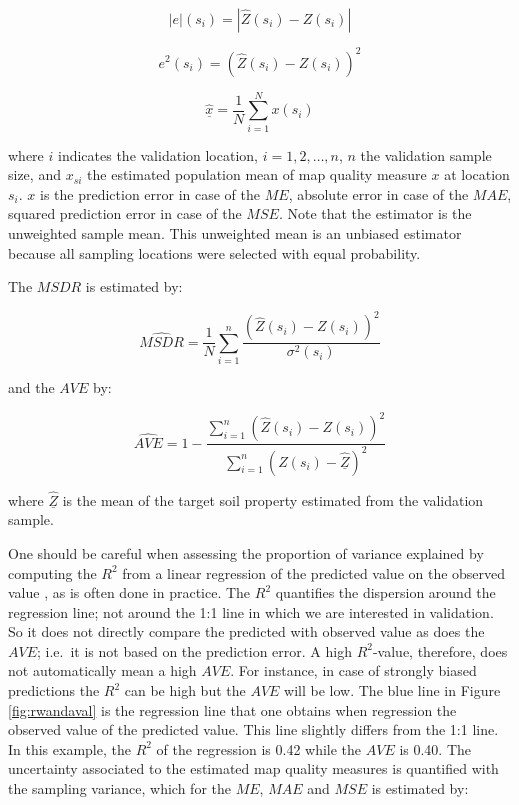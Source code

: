 \documentclass[10pt,b5paper,]{book}
\theoremstyle{definition}
\theoremstyle{definition}
\theoremstyle{definition}
\theoremstyle{remark}
\begin{document}
\begin{equation}
|e|(s_i) = |\hat{Z}(s_i) - Z(s_i)|
\end{equation}

\begin{equation}
e^2(s_i) =( \hat{Z}(s_i) - Z(s_i))^2
\end{equation}

\begin{equation}
\underline{\hat{x}} = \frac{1}{N} \sum_{i=1}^{N} x(s_i)
\end{equation}

where \(i\) indicates the validation location, \(i = 1, 2, \dots, n\),
\(n\) the validation sample size, and \(x_{si}\) the estimated
population mean of map quality measure \(x\) at location \(s_i\). \(x\)
is the prediction error in case of the \(ME\), absolute error in case of
the \(MAE\), squared prediction error in case of the \(MSE\). Note that
the estimator is the unweighted sample mean. This unweighted mean is an
unbiased estimator because all sampling locations were selected with
equal probability.

The \(MSDR\) is estimated by:

\begin{equation}
\widehat{M S D R} = \frac{1}{N} \sum_{i=1}^{n} \frac{(\hat{Z}(s_i) - Z(s_i))^2}{\sigma^2(s_i)}
\end{equation}

and the \(AVE\) by:

\begin{equation}
\widehat{A V E} = 1 - \frac{\sum_{i=1}^{n} (\hat{Z}(s_i) - Z(s_i))^2}{ \sum_{i=1}^{n} (Z(s_i) -  \underline{\hat{Z}})^2}
\end{equation}

where \(\underline{\hat{Z}}\) is the mean of the target soil property
estimated from the validation sample.

One should be careful when assessing the proportion of variance
explained by computing the \(R^2\) from a linear regression of the
predicted value on the observed value \citep{krause2005comparison}, as
is often done in practice. The \(R^2\) quantifies the dispersion around
the regression line; not around the 1:1 line in which we are interested
in validation. So it does not directly compare the predicted with
observed value as does the \(AVE\); i.e.~it is not based on the
prediction error. A high \(R^2\)-value, therefore, does not
automatically mean a high \(AVE\). For instance, in case of strongly
biased predictions the \(R^2\) can be high but the \(AVE\) will be low.
The blue line in Figure \ref{fig:rwandaval} is the regression line that
one obtains when regression the observed value of the predicted value.
This line slightly differs from the 1:1 line. In this example, the
\(R^2\) of the regression is 0.42 while the \(AVE\) is 0.40. The
uncertainty associated to the estimated map quality measures is
quantified with the sampling variance, which for the \(ME\), \(MAE\) and
\(MSE\) is estimated by:
\end{document}
